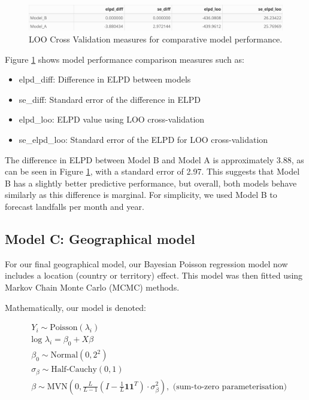 \documentclass[
]{article}
\providecommand{\tightlist}{%
  \setlength{\itemsep}{0pt}\setlength{\parskip}{0pt}}
\begin{document}
\begin{figure}

{\centering \includegraphics[width=1\linewidth]{../outputs/bayesian-analysis-monthly-freq/best-model-comp} 

}

\caption{LOO Cross Validation measures for comparative model performance.}\label{fig:figs13}
\end{figure}

Figure \ref{fig:figs13} shows model performance comparison measures such as:

\begin{itemize}
\tightlist
\item
  elpd\_diff: Difference in ELPD between models
\item
  se\_diff: Standard error of the difference in ELPD
\item
  elpd\_loo: ELPD value using LOO cross-validation
\item
  se\_elpd\_loo: Standard error of the ELPD for LOO cross-validation
\end{itemize}

The difference in ELPD between Model B and Model A is approximately 3.88, as can be seen in Figure \ref{fig:figs13}, with a standard error of 2.97. This suggests that Model B has a slightly better predictive performance, but overall, both models behave similarly as this difference is marginal. For simplicity, we used Model B to forecast landfalls per month and year.

\subsection{Model C: Geographical model}\label{model-c-geographical-model}

For our final geographical model, our Bayesian Poisson regression model now includes a location (country or territory) effect. This model was then fitted using Markov Chain Monte Carlo (MCMC) methods.

Mathematically, our model is denoted:

\begin{align*}
&Y_{i} \sim \text{Poisson}(\lambda_{i})\\
&\text{log } \lambda_{i} =  \beta_0 + X \beta\\
&\beta_0 \sim \text{Normal}(0,2^2)\\
&\sigma_{\beta} \sim \text{Half-Cauchy}(0,1)\\
&\beta \sim \text{MVN}( 0, \frac{L}{L-1}( I - \frac{1}{L} \mathbf{1}\mathbf{1}^T) \cdot \sigma_{\beta}^2), \text{ (sum-to-zero parameterisation)}\\
\end{align*}
\end{document}
